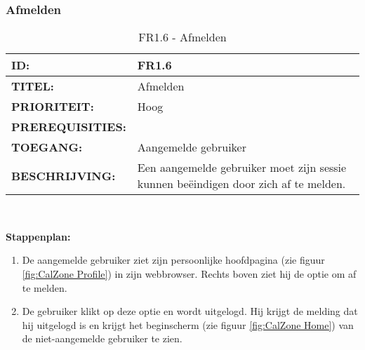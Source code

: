 
\subsubsection{Afmelden}
\noindent\begin{table}[H]
            \begin{tabular}{l | p{10cm}}
                \textbf{ID:} & FR1.6 \\ \hline
                \textbf{TITEL:} & Afmelden\\ \hline
                \textbf{PRIORITEIT:} &  Hoog \\ \hline
                \textbf{PREREQUISITIES:} & \\ \hline
                \textbf{TOEGANG:} &  Aangemelde gebruiker \\ \hline
                \textbf{BESCHRIJVING:} & Een aangemelde gebruiker moet zijn sessie kunnen be\"{e}indigen door zich af te melden.\\
            \end{tabular}\\
            \caption{FR1.6 - Afmelden}
            \label{tab:FR1.6 - Afmelden}
        \end{table}
\textbf{Stappenplan:}
\begin{enumerate}
\item De aangemelde gebruiker ziet zijn persoonlijke hoofdpagina (zie figuur \ref{fig:CalZone Profile}) in zijn webbrowser. Rechts boven ziet hij de optie om af te melden.
\item De gebruiker klikt op deze optie en wordt uitgelogd. Hij krijgt de melding dat hij uitgelogd is en krijgt het beginscherm (zie figuur \ref{fig:CalZone Home}) van de niet-aangemelde gebruiker te zien.
\end{enumerate}
 

